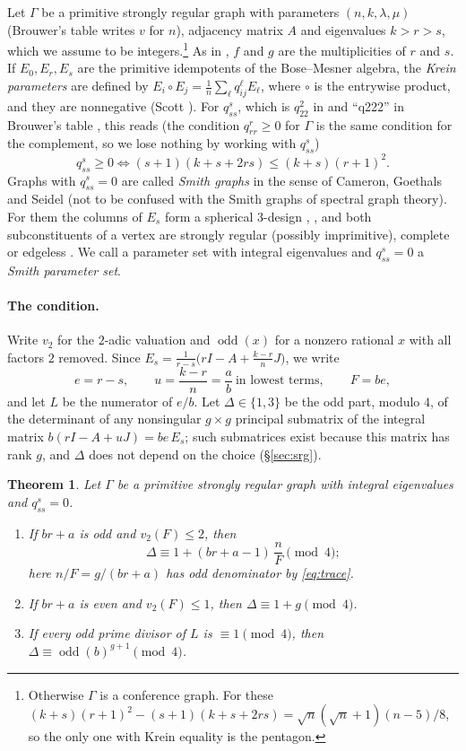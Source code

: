 \documentclass[11pt]{article}
\newtheorem{theorem}{Theorem}[section]
\theoremstyle{definition}
\theoremstyle{remark}
\newcommand{\odd}{\operatorname{odd}}
\begin{document}
Let $\Gamma$ be a primitive strongly regular graph with parameters
$(n,k,\lambda,\mu)$ (Brouwer's table writes $v$ for $n$), adjacency matrix $A$
and eigenvalues $k>r>s$, which we assume to be integers.\footnote{Otherwise
$\Gamma$ is a conference graph. For these
$(k+s)(r+1)^2-(s+1)(k+s+2rs)=\sqrt n(\sqrt n+1)(n-5)/8$, so the only one with
Krein equality is the pentagon.} As in \cite{BvM,Tab}, $f$ and $g$ are the
multiplicities of $r$ and $s$. If
$E_0,E_r,E_s$ are the primitive idempotents of the Bose--Mesner algebra, the
\emph{Krein parameters} are defined by $E_i\circ E_j=\frac1n\sum_\ell q^\ell_{ij}E_\ell$,
where $\circ$ is the entrywise product, and they are nonnegative (Scott
\cite{Scott}). For $q^s_{ss}$, which is $q^2_{22}$ in \cite{BvM} and ``q222''
in Brouwer's table \cite{Tab}, this reads (the condition $q^r_{rr}\ge0$ for
$\Gamma$ is the same condition for the complement, so we lose nothing by
working with $q^s_{ss}$)
\begin{equation}\label{eq:krein}
q^s_{ss}\ge 0\iff (s+1)(k+s+2rs)\le (k+s)(r+1)^2 .
\end{equation}
Graphs with $q^s_{ss}=0$ are called \emph{Smith graphs} in the sense of
Cameron, Goethals and Seidel \cite{CGS,Smith,BvM} (not to be confused with the
Smith graphs of spectral graph theory). For
them the columns of $E_s$ form a spherical $3$-design \cite{DGS,CGS78},
\cite[Prop.~8.15.2]{BvM}, and both subconstituents of a vertex are strongly
regular (possibly imprimitive), complete or edgeless \cite{CGS}. We call a
parameter set with integral eigenvalues and $q^s_{ss}=0$ a \emph{Smith
parameter set}.

\paragraph{The condition.}
Write $v_2$ for the $2$-adic valuation and $\odd(x)$ for a nonzero rational
$x$ with all factors $2$ removed. Since
$E_s=\frac1{r-s}\bigl(rI-A+\frac{k-r}nJ\bigr)$, we write
\[
 e=r-s,\qquad u=\frac{k-r}n=\frac ab\ \text{in lowest terms},\qquad F=be,
\]
and let $L$ be the numerator of $e/b$. Let $\Delta\in\{1,3\}$ be the odd
part, modulo $4$, of the determinant of any nonsingular $g\times g$ principal
submatrix of the integral matrix $b(rI-A+uJ)=be\,E_s$; such submatrices exist
because this matrix has rank $g$, and $\Delta$ does not depend on the choice
(\S\ref{sec:srg}).

\begin{theorem}\label{thm:main}
Let $\Gamma$ be a primitive strongly regular graph with integral eigenvalues
and $q^s_{ss}=0$.
\begin{enumerate}[label=\textup{(\alph*)}]
\item If $br+a$ is odd and $v_2(F)\le2$, then
\[
 \Delta\equiv1+(br+a-1)\,\frac nF\pmod 4 ;
\]
here $n/F=g/(br+a)$ has odd denominator by \eqref{eq:trace}.
\item If $br+a$ is even and $v_2(F)\le1$, then $\Delta\equiv1+g\pmod 4$.
\item If every odd prime divisor of $L$ is $\equiv1\pmod 4$, then
$\Delta\equiv\odd(b)^{g+1}\pmod 4$.
\end{enumerate}
\end{theorem}
\end{document}

